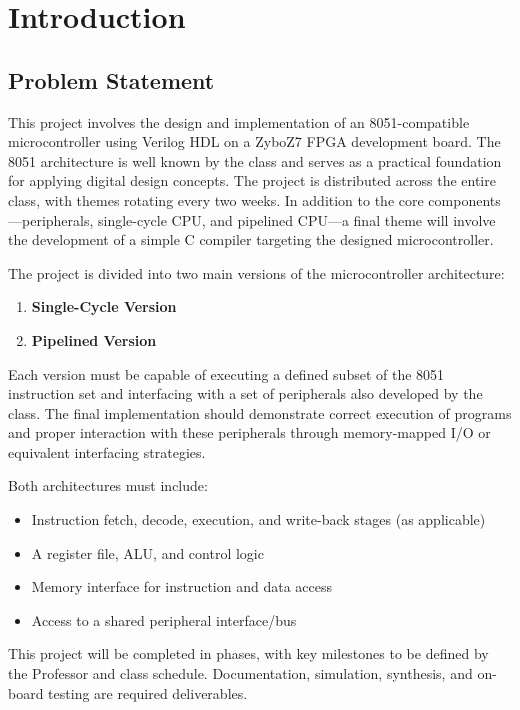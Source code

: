 \chapter{Introduction}
\section{Problem Statement}

This project involves the design and implementation of an 8051-compatible microcontroller 
using Verilog HDL on a ZyboZ7 FPGA development board. The 8051 architecture is well known by
the class and serves as a practical foundation for applying digital design concepts. 
The project is distributed across the entire class, with themes rotating every two weeks. 
In addition to the core components—peripherals, single-cycle CPU, and pipelined CPU—a final 
theme will involve the development of a simple C compiler targeting the designed 
microcontroller.

The project is divided into two main versions of the microcontroller architecture:
\begin{enumerate}
    \item \textbf{Single-Cycle Version}
    \item \textbf{Pipelined Version}
\end{enumerate}

Each version must be capable of executing a defined subset of the 8051 instruction set and 
interfacing with a set of peripherals also developed by the class. The final implementation
 should demonstrate correct execution of programs and proper interaction with these
  peripherals through memory-mapped I/O or equivalent interfacing strategies.

Both architectures must include:
\begin{itemize}
    \item Instruction fetch, decode, execution, and write-back stages (as applicable)
    \item A register file, ALU, and control logic
    \item Memory interface for instruction and data access
    \item Access to a shared peripheral interface/bus
\end{itemize}

This project will be completed in phases, with key milestones to be defined by the
 Professor and class schedule. Documentation, simulation, synthesis, and on-board 
 testing are required deliverables.

